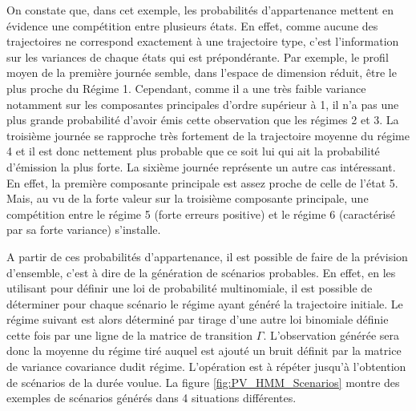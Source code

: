 \documentclass[12pt]{report}
\begin{document}
On constate que, dans cet exemple, les probabilités d'appartenance mettent en évidence une compétition entre plusieurs états. En effet, comme aucune des trajectoires ne correspond exactement à une trajectoire type, c'est l'information sur les variances de chaque états qui est prépondérante. Par exemple, le profil moyen de la première journée semble, dans l'espace de dimension réduit, être le plus proche du Régime 1. Cependant, comme il a une très faible variance notamment sur les composantes principales d'ordre supérieur à 1, il n'a pas une plus grande probabilité d'avoir émis cette observation que les régimes 2 et 3. La troisième journée se rapproche très fortement de la trajectoire moyenne du régime 4 et il est donc nettement plus probable que ce soit lui qui ait la probabilité d'émission la plus forte. La sixième journée représente un autre cas intéressant. En effet, la première composante principale est assez proche de celle de l'état 5. Mais, au vu de la forte valeur sur la troisième composante principale, une compétition entre le régime 5 (forte erreurs positive) et le régime 6 (caractérisé par sa forte variance) s'installe.

A partir de ces probabilités d'appartenance, il est possible de faire de la prévision d'ensemble, c'est à dire de la génération de scénarios probables. En effet, en les utilisant pour définir une loi de probabilité multinomiale, il est possible de déterminer pour chaque scénario le régime ayant généré la trajectoire initiale. Le régime suivant est alors déterminé par tirage d'une autre loi binomiale définie cette fois par une ligne de la matrice de transition $\Gamma$. L'observation générée sera donc la moyenne du régime tiré auquel est ajouté un bruit définit par la matrice de variance covariance dudit régime. L'opération est à répéter jusqu'à l'obtention de scénarios de la durée voulue. La figure \ref{fig:PV_HMM_Scenarios} montre des exemples de scénarios générés dans 4 situations différentes.
\end{document}

